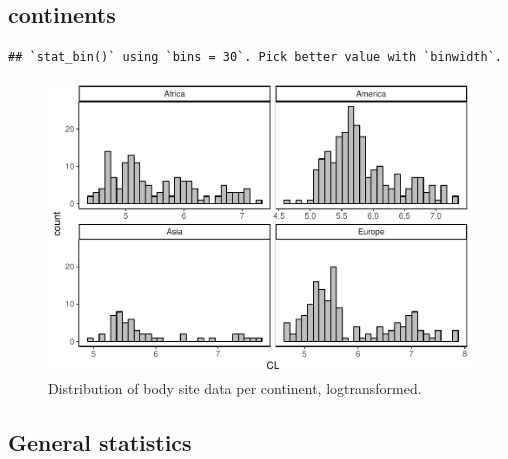 \documentclass[]{article}
\begin{document}
\newpage

\subsection{continents}\label{continents}

\begin{verbatim}
## `stat_bin()` using `bins = 30`. Pick better value with `binwidth`.
\end{verbatim}

\begin{figure}[htbp]
\centering
\includegraphics{MA_JJ_files/figure-latex/Histograms of body size data, split by continents-1.pdf}
\caption{Distribution of body site data per continent, logtransformed.}
\end{figure}

\newpage

\subsection{General statistics}\label{general-statistics}
\end{document}
